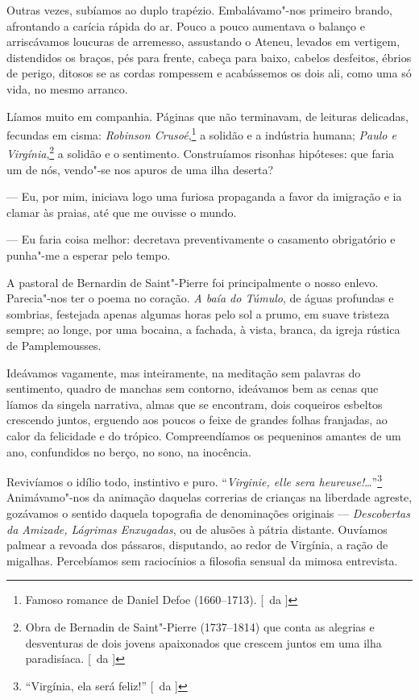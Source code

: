 Outras vezes, subíamos ao duplo
trapézio. Embalávamo"-nos primeiro brando, afrontando a carícia rápida
do ar. Pouco a pouco aumentava o balanço e arriscávamos loucuras de
arremesso, assustando o Ateneu, levados em vertigem, distendidos os
braços, pés para frente, cabeça para baixo, cabelos desfeitos, ébrios
de perigo, ditosos se as cordas rompessem e acabássemos os dois ali,
como uma só vida, no mesmo arranco. 

Líamos muito em companhia. Páginas
que não terminavam, de leituras delicadas, fecundas em cisma: \textit{Robinson
Crusoé},\footnote{ Famoso romance de Daniel Defoe (1660--1713). [~da ]} a solidão 
e a indústria humana; \textit{Paulo e Virgínia},\footnote{ Obra de Bernadin 
de Saint"-Pierre (1737--1814) que conta as alegrias e desventuras de dois 
jovens apaixonados que crescem juntos em uma ilha paradisíaca. [~da ]} a solidão e o
sentimento. Construíamos risonhas hipóteses: que faria um de nós,
vendo"-se nos apuros de uma ilha deserta? 

--- Eu, por mim, iniciava logo uma furiosa propaganda a favor 
da imigração e ia clamar às praias, até que me ouvisse o mundo. 

--- Eu faria coisa melhor: decretava preventivamente o casamento 
obrigatório e punha"-me a esperar pelo tempo. 

A pastoral de Bernardin de Saint"-Pierre foi principalmente o
nosso enlevo. Parecia"-nos ter o poema no coração. \textit{A baía do Túmulo},
de águas profundas e sombrias, festejada apenas algumas horas pelo sol
a prumo, em suave tristeza sempre; ao longe, por uma bocaina, a
fachada, à vista, branca, da igreja rústica de Pamplemousses. 

Ideávamos vagamente, mas inteiramente, na meditação sem palavras do sentimento,
quadro de manchas sem contorno, ideávamos bem as cenas que líamos da singela
narrativa, almas que se encontram, dois coqueiros esbeltos crescendo
juntos, erguendo aos poucos o feixe de grandes folhas franjadas, ao
calor da felicidade e do trópico. Compreendíamos os pequeninos amantes
de um ano, confundidos no berço, no sono, na inocência. 

Revivíamos o idílio todo, instintivo e puro. ``\textit{Virginie, elle sera heureuse!}\ldots{}''\footnote{ ``Virgínia, 
ela será feliz!'' [~da ]} Animávamo"-nos da animação daquelas correrias de crianças na liberdade
agreste, gozávamos o sentido daquela topografia de denominações
originais --- \textit{Descobertas da Amizade, Lágrimas Enxugadas}, ou de alusões
à pátria distante. Ouvíamos palmear a revoada dos pássaros, disputando,
ao redor de Virgínia, a ração de migalhas. Percebíamos sem raciocínios
a filosofia sensual da mimosa entrevista.

